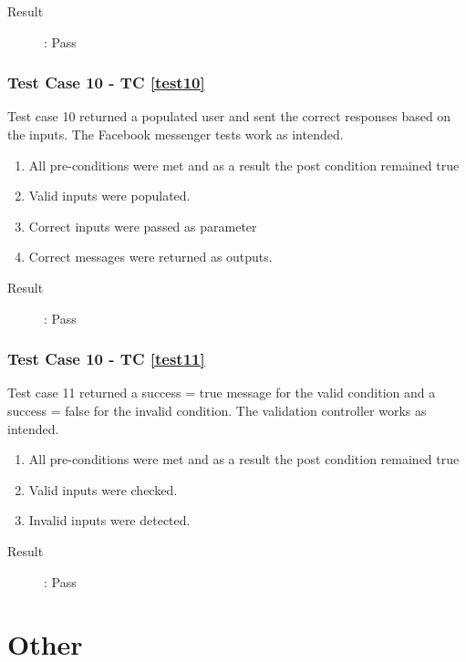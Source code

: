 \documentclass{article}
\begin{document}
\begin{description}
	\item [Result]: Pass 
\end{description}

\subsubsection{Test Case 10 - TC \ref{test10}}
Test case 10 returned a populated user and sent the correct responses based on the inputs.
The Facebook messenger tests work as intended.
\begin{enumerate}
	\item All pre-conditions were met and as a result the post condition remained true
	\item Valid inputs were populated.
	\item Correct inputs were passed as parameter 
	\item Correct messages were returned as outputs.
\end{enumerate}

\begin{description}
	\item [Result]: Pass 
\end{description}



\subsubsection{Test Case 10 - TC \ref{test11}}
Test case 11 returned a success = true message for the valid condition and a success = false for the invalid condition.
The validation controller works as intended.
\begin{enumerate}
	\item All pre-conditions were met and as a result the post condition remained true
	\item Valid inputs were checked.
	\item Invalid inputs were detected.
\end{enumerate}

\begin{description}
	\item [Result]: Pass 
\end{description}




\pagebreak
\section{Other}
\end{document}
